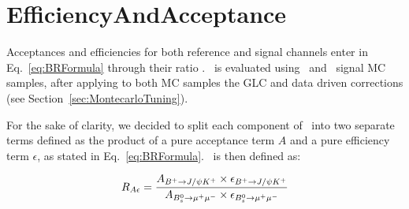 \section{EfficiencyAndAcceptance}
\label{sec:EfficiencyAndAcceptance}

Acceptances and efficiencies for both reference and signal channels enter in
Eq.~\ref{eq:BRFormula} through their ratio \theRho.
\theRho\ is evaluated using \Bsmumu\ and \BpKpJpsi\ signal MC samples, 
after applying to both MC samples the GLC and data driven corrections (see Section~\ref{sec:MontecarloTuning}). 

For the sake of clarity, we decided to split each component of \theRho\ into two separate
terms defined as the product of a pure acceptance term $A$ and a pure efficiency term
$\epsilon$, as stated in Eq.~\ref{eq:BRFormula}. \theRho\ is then defined as:

\begin{equation}
R_{A\epsilon} = \frac{A_{B^+ \to J/\psi K^+} \times \epsilon_{B^+ \to J/\psi K^+}}{A_{B_s^0 \to \mu^+\mu^-} \times \epsilon_{B_s^0 \to \mu^+\mu^-}}
\label{eq:eff_ratio}
\end{equation}

